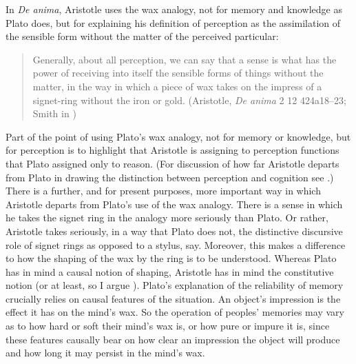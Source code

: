 In \emph{De anima}, Aristotle uses the wax analogy, not for memory and knowledge as Plato does, but for explaining his definition of perception as the assimilation of the sensible form without the matter of the perceived particular:
\begin{quote}
	Generally, about all perception, we can say that a sense is what has the power of receiving into itself the sensible forms of things without the matter, in the way in which a piece of wax takes on the impress of a signet-ring without the iron or gold. (Aristotle, \emph{De anima} 2 12 424a18–23; Smith in \citealt[42--43]{Barnes:1984uq})
\end{quote}
Part of the point of using Plato's wax analogy, not for memory or knowledge, but for perception is to highlight that Aristotle is assigning to perception functions that Plato assigned only to reason. (For discussion of how far Aristotle departs from Plato in drawing the distinction between perception and cognition see \citealt{Sorabji:1971fr,Sorabji:2003fk}.)
There is a further, and for present purposes, more important way in which Aristotle departs from Plato's use of the wax analogy. There is a sense in which he takes the signet ring in the analogy more seriously than Plato. Or rather, Aristotle takes seriously, in a way that Plato does not, the distinctive discursive role of signet rings as opposed to a stylus, say. Moreover, this makes a difference to how the shaping of the wax by the ring is to be understood. Whereas Plato has in mind a causal notion of shaping, Aristotle has in mind the constitutive notion (or at least, so I argue \citealt[Chapter 9]{Kalderon:2015fr}). Plato’s explanation of the reliability of memory crucially relies on causal features of the situation. An object’s impression is the effect it has on the mind’s wax. So the operation of peoples' memories may vary as to how hard or soft their mind's wax is, or how pure or impure it is, since these features causally bear on how clear an impression the object will produce and how long it may persist in the mind's wax. 

